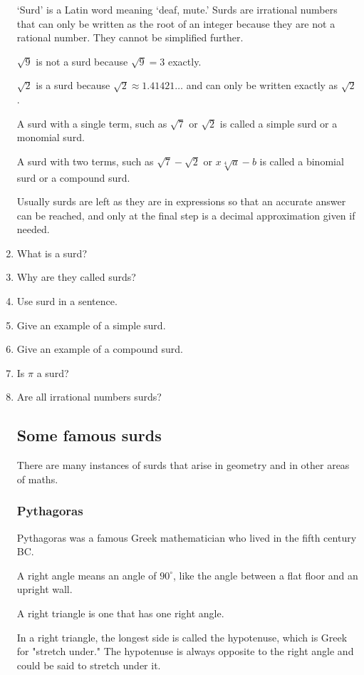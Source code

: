 \documentclass{article}
\begin{document}
\begin{enumerate}
‘Surd’ is a Latin word meaning ‘deaf, mute.’ Surds are irrational numbers that can only be written as the root of an integer because they are not a rational number. They cannot be simplified further.

$\sqrt{9}$ is not a surd because $\sqrt{9}=3$ exactly.

$\sqrt{2}$ is a surd because $\sqrt{2}\approx 1.41421\ldots$ and can only be written exactly as $\sqrt{2}$.

A surd with a single term, such as $\sqrt{7}$ or $\sqrt{2}$ is called a simple surd or a monomial surd.

A surd with two terms, such as $\sqrt{7}-\sqrt{2}$ or $x\sqrt[4]{a}-b$ is called a binomial surd or a compound surd.

Usually surds are left as they are in expressions so that an accurate answer can be reached, and only at the final step is a decimal approximation given if needed.

\item What is a surd?
\item Why are they called surds?
\item Use surd in a sentence.
\item Give an example of a simple surd.
\item Give an example of a compound surd.
\item Is $\pi$ a surd?
\item Are all irrational numbers surds?

\subsection*{Some famous surds}

There are many instances of surds that arise in geometry and in other areas of maths.

\subsubsection*{Pythagoras}

Pythagoras was a famous Greek mathematician who lived in the fifth century BC.

A right angle means an angle of $90^{\circ}$, like the angle between a flat floor and an upright wall.

A right triangle is one that has one right angle.

In a right triangle, the longest side is called the hypotenuse, which is Greek for "stretch under." The hypotenuse is always opposite to the right angle and could be said to stretch under it.


\end{enumerate}
\end{document}
